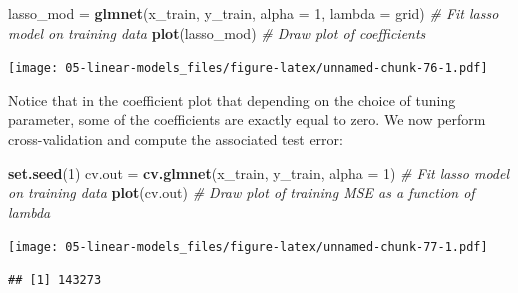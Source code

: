 \documentclass[openany]{book}
\newenvironment{Shaded}{\begin{snugshade}}{\end{snugshade}}
\newcommand{\CommentTok}[1]{\textcolor[rgb]{0.56,0.35,0.01}{\textit{#1}}}
\newcommand{\DataTypeTok}[1]{\textcolor[rgb]{0.13,0.29,0.53}{#1}}
\newcommand{\DecValTok}[1]{\textcolor[rgb]{0.00,0.00,0.81}{#1}}
\newcommand{\KeywordTok}[1]{\textcolor[rgb]{0.13,0.29,0.53}{\textbf{#1}}}
\newcommand{\NormalTok}[1]{#1}
\newcommand{\OperatorTok}[1]{\textcolor[rgb]{0.81,0.36,0.00}{\textbf{#1}}}
\newcommand{\StringTok}[1]{\textcolor[rgb]{0.31,0.60,0.02}{#1}}
\begin{document}
\begin{Shaded}
\begin{Highlighting}[]
\NormalTok{lasso_mod =}\StringTok{ }\KeywordTok{glmnet}\NormalTok{(x_train, y_train, }\DataTypeTok{alpha =} \DecValTok{1}\NormalTok{, }\DataTypeTok{lambda =}\NormalTok{ grid) }\CommentTok{# Fit lasso model on training data}
\KeywordTok{plot}\NormalTok{(lasso_mod)                                          }\CommentTok{# Draw plot of coefficients}
\end{Highlighting}
\end{Shaded}

\texttt{[image: 05-linear-models\_files/figure-latex/unnamed-chunk-76-1.pdf]}

Notice that in the coefficient plot that depending on the choice of tuning
parameter, some of the coefficients are exactly equal to zero. We now
perform cross-validation and compute the associated test error:

\begin{Shaded}
\begin{Highlighting}[]
\KeywordTok{set.seed}\NormalTok{(}\DecValTok{1}\NormalTok{)}
\NormalTok{cv.out =}\StringTok{ }\KeywordTok{cv.glmnet}\NormalTok{(x_train, y_train, }\DataTypeTok{alpha =} \DecValTok{1}\NormalTok{) }\CommentTok{# Fit lasso model on training data}
\KeywordTok{plot}\NormalTok{(cv.out) }\CommentTok{# Draw plot of training MSE as a function of lambda}
\end{Highlighting}
\end{Shaded}

\texttt{[image: 05-linear-models\_files/figure-latex/unnamed-chunk-77-1.pdf]}

\begin{Shaded}
\end{Shaded}

\begin{verbatim}
## [1] 143273
\end{verbatim}
\end{document}

